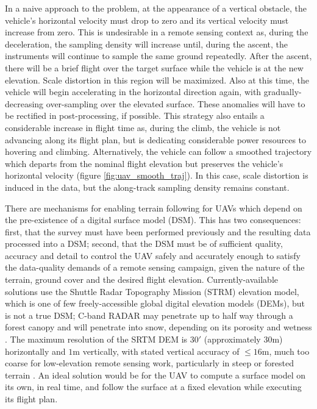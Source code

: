 \documentclass[10pt]{article}
\begin{document}
In a naive approach to the problem, at the appearance of a vertical obstacle, the vehicle's horizontal velocity must drop to zero and its vertical velocity must increase from zero. This is undesirable in a remote sensing context as, during the deceleration, the sampling density will increase until, during the ascent, the instruments will continue to sample the same ground repeatedly. After the ascent, there will be a brief flight over the target surface while the vehicle is at the new elevation. Scale distortion in this region will be maximized. Also at this time, the vehicle will begin accelerating in the horizontal direction again, with gradually-decreasing over-sampling over the elevated surface. These anomalies will have to be rectified in post-processing, if possible. This strategy also entails a considerable increase in flight time as, during the climb, the vehicle is not advancing along its flight plan, but is dedicating considerable power resources to hovering and climbing. Alternatively, the vehicle can follow a smoothed trajectory which departs from the nominal flight elevation but preserves the vehicle's horizontal velocity (figure \ref{fig:uav_smooth_traj}). In this case, scale distortion is induced in the data, but the along-track sampling density remains constant.

There are mechanisms for enabling terrain following for UAVs which depend on the pre-existence of a digital surface model (DSM). This has two consequences: first, that the survey must have been performed previously and the resulting data processed into a DSM; second, that the DSM must be of sufficient quality, accuracy and detail to control the UAV safely and accurately enough to satisfy the data-quality demands of a remote sensing campaign, given the nature of the terrain, ground cover and the desired flight elevation. Currently-available solutions \cite{ArduPilot2017,Tudor2017} use the Shuttle Radar Topography Mission (STRM) elevation model, which is one of few freely-accessible global digital elevation models (DEMs), but is not a true DSM; C-band RADAR may penetrate up to half way through a forest canopy \cite{Carabajal2005} and will penetrate into snow, depending on its porosity and wetness \cite{Tighe2009}. The maximum resolution of the SRTM DEM is $30'$ (approximately $30\si{\m}$) horizontally and $1\si{\m}$ vertically, with stated vertical accuracy of $\leq16\si{\m}$, much too coarse for low-elevation remote sensing work, particularly in steep or forested terrain \cite{Smith2003a,Tom2008}. An ideal solution would be for the UAV to compute a surface model on its own, in real time, and follow the surface at a fixed elevation while executing its flight plan. 
\end{document}
